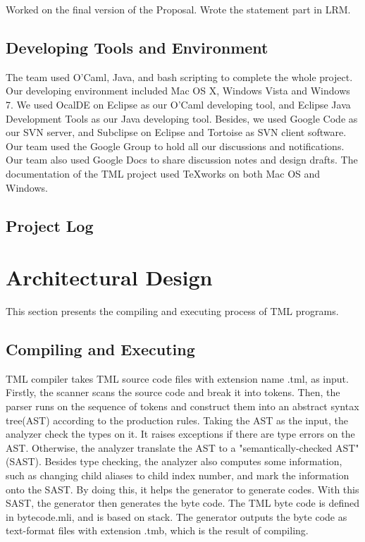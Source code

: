 \documentclass[12pt,psfig,a4]{article}
\begin{document}
Worked on the final version of the Proposal. Wrote the statement part in LRM. 

\subsection{Developing Tools and Environment}
The team used O'Caml, Java, and bash scripting to complete the whole project. Our developing environment included Mac OS X, Windows Vista and Windows 7. We used OcalDE on Eclipse as our O'Caml developing tool, and Eclipse Java Development Tools as our Java developing tool. Besides, we used Google Code as our SVN server, and Subclipse on Eclipse and Tortoise as SVN client software. Our team used the Google Group to hold all our discussions and notifications. Our team also used Google Docs to share discussion notes and design drafts. The documentation of the TML project used TeXworks on both Mac OS and Windows.

\subsection{Project Log}
\begin{tt}
\lstset{basicstyle=\scriptsize}

\end{tt}

\pagebreak
\section{Architectural Design}
This section presents the compiling and executing process of TML programs.

\subsection{Compiling and Executing}
TML compiler takes TML source code files with extension name .tml, as input. Firstly, the scanner scans the source code and break it into tokens. Then, the parser runs on the sequence of tokens and construct them into an abstract syntax tree(AST) according to the production rules. Taking the AST as the input, the analyzer check the types on it. It raises exceptions if there are type errors on the AST. Otherwise, the analyzer translate the AST to a "semantically-checked AST"(SAST). Besides type checking, the analyzer also computes some information, such as changing child aliases to child index number, and mark the information onto the SAST. By doing this, it helps the generator to generate codes. With this SAST, the generator then generates the byte code. The TML byte code is defined in bytecode.mli, and is based on stack. The generator outputs the byte code as text-format files with extension .tmb, which is the result of compiling.
\end{document}
